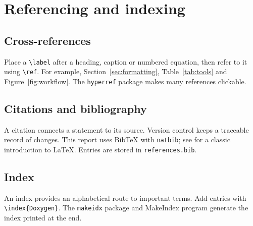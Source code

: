 \section{Referencing and indexing}\label{sec:references}
\subsection{Cross-references}
Place a \texttt{\textbackslash label} after a heading, caption or numbered equation, then refer to it using \texttt{\textbackslash ref}. For example, Section~\ref{sec:formatting}, Table~\ref{tab:tools} and Figure~\ref{fig:workflow}. The \texttt{hyperref} package makes many references clickable.
\subsection{Citations and bibliography}
A citation connects a statement to its source. Version control keeps a traceable record of changes. This report uses BibTeX with \texttt{natbib}; see \citep{lamport1994latex} for a classic introduction to LaTeX. Entries are stored in \texttt{references.bib}.
\subsection{Index}
An index provides an alphabetical route to important terms. Add entries with \texttt{\textbackslash index\{Doxygen\}}. The \texttt{makeidx} package and MakeIndex program generate the index printed at the end.
